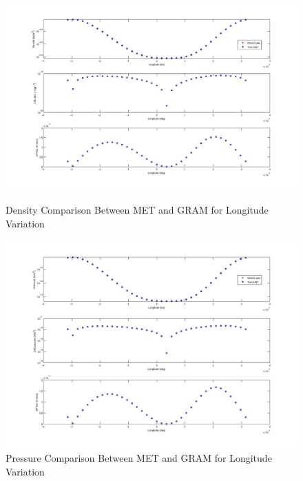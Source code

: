 \begin{description}
\begin{figure}[H]
\begin{center}
\includegraphics[height=80mm]{pics/MET_GRA_T03_density.jpg}
\caption{Density Comparison Between MET and GRAM for Longitude Variation}
\label{met_gram_lon_dens}
\end{center}
\end{figure}

\begin{figure}[H]
\begin{center}
\includegraphics[height=80mm]{pics/MET_GRA_T03_pressure.jpg}
\caption{Pressure Comparison Between MET and GRAM for Longitude Variation}
\label{met_gram_lon_press}
\end{center}
\end{figure}


\end{description}
